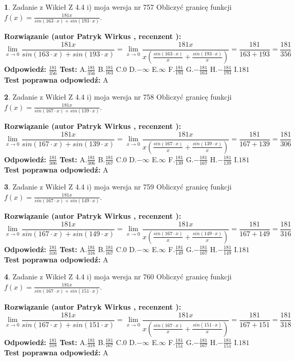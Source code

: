 \documentclass[12pt, a4paper]{article}
\theoremstyle{definition} %
\newtheorem{zad}{}
\newcommand{\zadStart}[1]{\begin{zad}#1\newline}
\newcommand{\zadStop}{\end{zad}}
\newcommand{\rozwStart}[2]{\noindent \textbf{Rozwiązanie (autor #1 , recenzent #2): }\newline}
\newcommand{\rozwStop}{\newline}
\newcommand{\odpStart}{\noindent \textbf{Odpowiedź:}\newline}
\newcommand{\odpStop}{\newline}
\newcommand{\testStart}{\noindent \textbf{Test:}\newline}
\newcommand{\testStop}{\newline}
\newcommand{\kluczStart}{\noindent \textbf{Test poprawna odpowiedź:}\newline}
\newcommand{\kluczStop}{\newline}
\begin{document}
\zadStart{Zadanie z Wikieł Z 4.4 i) moja wersja nr 757}
Obliczyć granicę funkcji $f(x)=\frac{181x}{sin(163\cdot x) +sin(193\cdot x)}$.
\zadStop
\rozwStart{Patryk Wirkus}{}
$$\lim\limits_{x\to 0}\frac{181x}{sin(163\cdot x) +sin(193\cdot x)}=\lim\limits_{x\to 0}\frac{181x}{x(\frac{sin(163\cdot x)}{x}+\frac{sin(193\cdot x)}{x})}=\frac{181}{163+193} = \frac{181}{356}$$
\rozwStop
\odpStart
$\frac{181}{356}$
\odpStop
\testStart
A.$\frac{181}{356}$
B.$\frac{181}{163}$
C.$0$
D.$-\infty$
E.$\infty$
F.$\frac{181}{193}$
G.$-\frac{181}{163}$
H.$-\frac{181}{193}$
I.$181$
\testStop
\kluczStart
A
\kluczStop



\zadStart{Zadanie z Wikieł Z 4.4 i) moja wersja nr 758}
Obliczyć granicę funkcji $f(x)=\frac{181x}{sin(167\cdot x) +sin(139\cdot x)}$.
\zadStop
\rozwStart{Patryk Wirkus}{}
$$\lim\limits_{x\to 0}\frac{181x}{sin(167\cdot x) +sin(139\cdot x)}=\lim\limits_{x\to 0}\frac{181x}{x(\frac{sin(167\cdot x)}{x}+\frac{sin(139\cdot x)}{x})}=\frac{181}{167+139} = \frac{181}{306}$$
\rozwStop
\odpStart
$\frac{181}{306}$
\odpStop
\testStart
A.$\frac{181}{306}$
B.$\frac{181}{167}$
C.$0$
D.$-\infty$
E.$\infty$
F.$\frac{181}{139}$
G.$-\frac{181}{167}$
H.$-\frac{181}{139}$
I.$181$
\testStop
\kluczStart
A
\kluczStop



\zadStart{Zadanie z Wikieł Z 4.4 i) moja wersja nr 759}
Obliczyć granicę funkcji $f(x)=\frac{181x}{sin(167\cdot x) +sin(149\cdot x)}$.
\zadStop
\rozwStart{Patryk Wirkus}{}
$$\lim\limits_{x\to 0}\frac{181x}{sin(167\cdot x) +sin(149\cdot x)}=\lim\limits_{x\to 0}\frac{181x}{x(\frac{sin(167\cdot x)}{x}+\frac{sin(149\cdot x)}{x})}=\frac{181}{167+149} = \frac{181}{316}$$
\rozwStop
\odpStart
$\frac{181}{316}$
\odpStop
\testStart
A.$\frac{181}{316}$
B.$\frac{181}{167}$
C.$0$
D.$-\infty$
E.$\infty$
F.$\frac{181}{149}$
G.$-\frac{181}{167}$
H.$-\frac{181}{149}$
I.$181$
\testStop
\kluczStart
A
\kluczStop



\zadStart{Zadanie z Wikieł Z 4.4 i) moja wersja nr 760}
Obliczyć granicę funkcji $f(x)=\frac{181x}{sin(167\cdot x) +sin(151\cdot x)}$.
\zadStop
\rozwStart{Patryk Wirkus}{}
$$\lim\limits_{x\to 0}\frac{181x}{sin(167\cdot x) +sin(151\cdot x)}=\lim\limits_{x\to 0}\frac{181x}{x(\frac{sin(167\cdot x)}{x}+\frac{sin(151\cdot x)}{x})}=\frac{181}{167+151} = \frac{181}{318}$$
\rozwStop
\odpStart
$\frac{181}{318}$
\odpStop
\testStart
A.$\frac{181}{318}$
B.$\frac{181}{167}$
C.$0$
D.$-\infty$
E.$\infty$
F.$\frac{181}{151}$
G.$-\frac{181}{167}$
H.$-\frac{181}{151}$
I.$181$
\testStop
\kluczStart
A
\kluczStop
\end{document}
